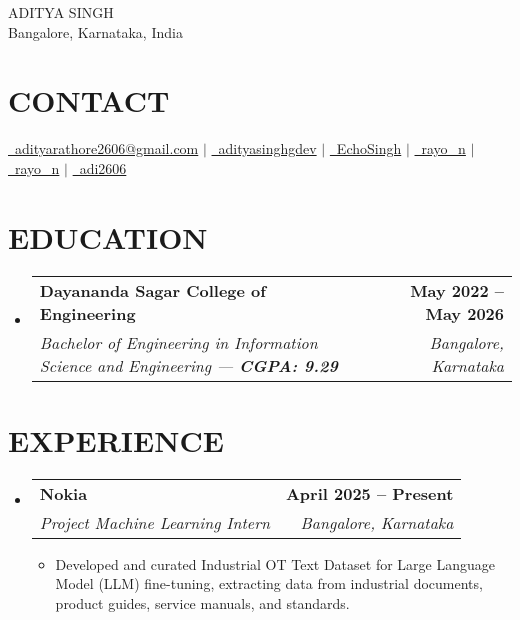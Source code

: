 \documentclass[letterpaper,10pt]{article}
\makeatletter
\newcommand{\resumeSubHeadingListStart}{\begin{itemize}[leftmargin=0.15in,label={}]}
\newcommand{\resumeSubHeadingListEnd}{\end{itemize}}
\newcommand{\resumeSubheading}[4]{%
  \item
  \begin{tabular*}{1.0\textwidth}[t]{l@{\extracolsep{\fill}}r}
    \textbf{#1} & {\small\bfseries #2} \\
    \textit{\color{primary} #3} & {\textit{\color{primary} #4}} \\
  \end{tabular*}\vspace{-2pt}
}
\newcommand{\resumeItemListStart}{\begin{itemize}[leftmargin=12pt]}
\newcommand{\resumeItemListEnd}{\end{itemize}}
\newcommand{\resumeItem}[1]{\item\small{#1}}
\makeatother
\begin{document}
\begin{center}
    {\Huge \scshape ADITYA SINGH} \\[6pt]
    \large Bangalore, Karnataka, India \\[8pt]
\end{center}

\section{CONTACT}
\begin{center}
\small

\href{mailto:adityarathore2606@gmail.com}{\raisebox{-0.1\height}{\faEnvelope}\ adityarathore2606@gmail.com} $|$
\href{https://linkedin.com/in/adityasinghgdev}{\raisebox{-0.1\height}{\faLinkedin}\ adityasinghgdev} $|$
\href{https://github.com/EchoSingh}{\raisebox{-0.1\height}{\faGithub}\ EchoSingh} $|$
\href{https://leetcode.com/rayo_n}{\raisebox{-0.1\height}{\faCode}\ rayo\_n} $|$
\href{https://www.hackerrank.com/rayo_n}{\raisebox{-0.1\height}{\faHackerrank}\ rayo\_n} $|$
\href{https://www.kaggle.com/adi2606}{\raisebox{-0.1\height}{\faKaggle}\ adi2606}
\end{center}


\section{EDUCATION}
\vspace{5 pt}
  \resumeSubHeadingListStart
    \resumeSubheading
      {Dayananda Sagar College of Engineering}{May 2022 -- May 2026}
      {Bachelor of Engineering in Information Science and Engineering --- \textbf{CGPA: 9.29}}{Bangalore, Karnataka}
  \resumeSubHeadingListEnd

\section{EXPERIENCE}
\vspace{5 pt}
  \resumeSubHeadingListStart
    \resumeSubheading
      {Nokia}{April 2025 -- Present}
      {Project Machine Learning Intern}{Bangalore, Karnataka}
      \resumeItemListStart
        \resumeItem{Developed and curated Industrial OT Text Dataset for Large Language Model (LLM) fine-tuning, extracting data from industrial documents, product guides, service manuals, and standards.}
      \resumeItemListEnd
  \resumeSubHeadingListEnd
\end{document}
